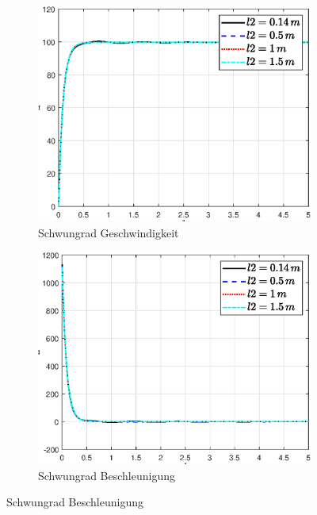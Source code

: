 \begin{figure}
    \captionsetup[subfigure]{justification=centering,font=footnotesize}
    \begin{subfigure}[b]{0.49\linewidth}
        \includegraphics[width=\linewidth]{Bilder/5_sensi/fig/l2/phi_punkt.eps}
        \caption{Schwungrad Geschwindigkeit}
        \label{fig:l2_phi_punkt}
    \end{subfigure}
    \begin{subfigure}[b]{0.49 \linewidth}
        \includegraphics[width=\linewidth]{Bilder/5_sensi/fig/l2/phi_punkt_punkt.eps}
        \caption{Schwungrad Beschleunigung}
        \label{fig:l2_phi_punkt_punkt}

\end{subfigure}
\end{figure}
